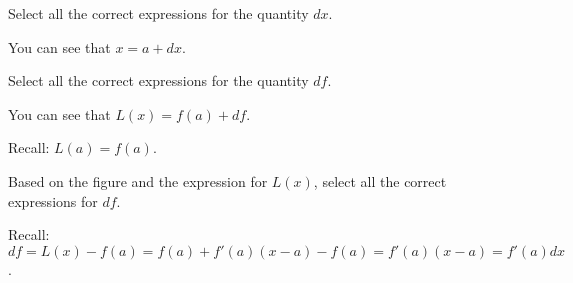 \documentclass{ximera}
\begin{document}
\begin{question}
  Select all the correct expressions for the quantity $dx$.
   \begin{hint}
     You can see that $x=a+dx$.
    \end{hint}
    \begin{selectAll}
    \end{selectAll}
   
  \end{question}
  \begin{question}
  Select all the correct expressions for the quantity $df$.
   \begin{hint}
     You can see that $L(x)=f(a)+df$.
    \end{hint}
      \begin{hint}
    Recall: $L(a)=f(a)$.
    \end{hint}
    \begin{selectAll}
         
    \end{selectAll}
   
  \end{question}

 \begin{question}
Based on  the figure and the expression for $L(x)$, select all the correct expressions for $df$.
 \begin{hint}
    Recall: $df=L(x)-f(a)=f(a)+f'(a)(x-a)-f(a)=f'(a)(x-a)=f'(a)dx$.
    \end{hint}
      \begin{selectAll}
      \end{selectAll}
  \end{question}
\end{document}

